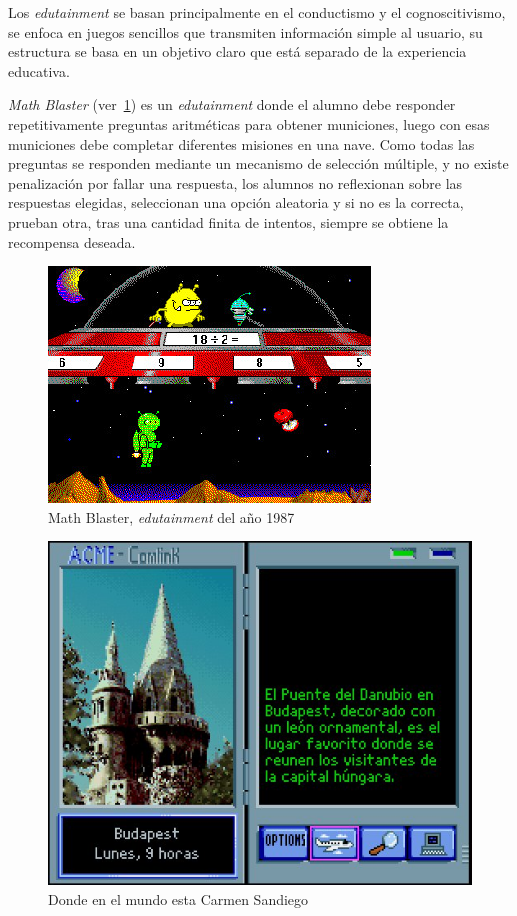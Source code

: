 Los \emph{edutainment} se basan principalmente en el conductismo y el
cognoscitivismo, se enfoca en juegos sencillos que transmiten información simple
al usuario, su estructura se basa en un objetivo claro que está separado de la
experiencia educativa\cite{egenfeldt2007third}. 

\emph{Math Blaster} (ver~\ref{fig:math_blaster}) es un \emph{edutainment} donde
el alumno debe responder repetitivamente preguntas aritméticas para obtener
municiones, luego con esas municiones debe completar diferentes misiones en una
nave\cite{bruckman1999can}. Como todas las preguntas se responden mediante un
mecanismo de selección múltiple, y no existe penalización por fallar una
respuesta, los alumnos no reflexionan sobre las respuestas elegidas, seleccionan
una opción aleatoria y si no es la correcta, prueban otra, tras una cantidad
finita de intentos, siempre se obtiene la recompensa deseada.

\begin{figure}[ht!] 
\centering 
\includegraphics[scale=0.5,natwidth=296,natheight=217]{tics/images/math_blaster.jpg}
\caption{Math Blaster, \emph{edutainment} del año 1987}
\label{fig:math_blaster} 
\end{figure}

\begin{figure}[ht!] 
\centering 
\includegraphics[scale=0.5]{tics/images/carmen.jpg}
\caption{Donde en el mundo esta Carmen Sandiego} 
\label{fig:carmen}
\end{figure}


